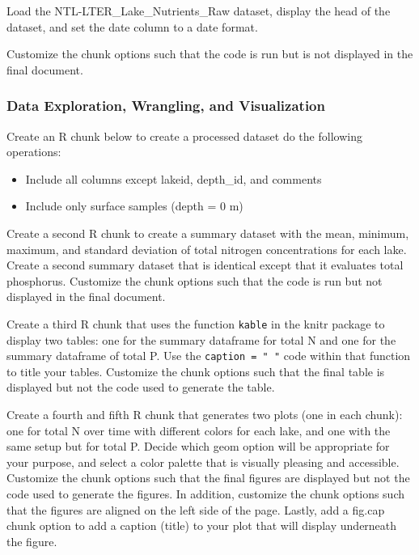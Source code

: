\documentclass[]{article}
\providecommand{\tightlist}{%
  \setlength{\itemsep}{0pt}\setlength{\parskip}{0pt}}
\begin{document}
Load the NTL-LTER\_Lake\_Nutrients\_Raw dataset, display the head of the
dataset, and set the date column to a date format.

Customize the chunk options such that the code is run but is not
displayed in the final document.

\hypertarget{data-exploration-wrangling-and-visualization}{%
\subsubsection{Data Exploration, Wrangling, and
Visualization}\label{data-exploration-wrangling-and-visualization}}

Create an R chunk below to create a processed dataset do the following
operations:

\begin{itemize}
\tightlist
\item
  Include all columns except lakeid, depth\_id, and comments
\item
  Include only surface samples (depth = 0 m)
\end{itemize}

Create a second R chunk to create a summary dataset with the mean,
minimum, maximum, and standard deviation of total nitrogen
concentrations for each lake. Create a second summary dataset that is
identical except that it evaluates total phosphorus. Customize the chunk
options such that the code is run but not displayed in the final
document.

Create a third R chunk that uses the function \texttt{kable} in the
knitr package to display two tables: one for the summary dataframe for
total N and one for the summary dataframe of total P. Use the
\texttt{caption\ =\ "\ "} code within that function to title your
tables. Customize the chunk options such that the final table is
displayed but not the code used to generate the table.

Create a fourth and fifth R chunk that generates two plots (one in each
chunk): one for total N over time with different colors for each lake,
and one with the same setup but for total P. Decide which geom option
will be appropriate for your purpose, and select a color palette that is
visually pleasing and accessible. Customize the chunk options such that
the final figures are displayed but not the code used to generate the
figures. In addition, customize the chunk options such that the figures
are aligned on the left side of the page. Lastly, add a fig.cap chunk
option to add a caption (title) to your plot that will display
underneath the figure.
\end{document}
